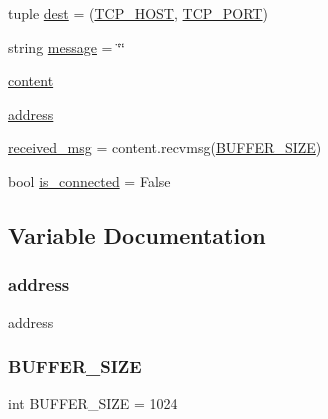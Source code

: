 \begin{DoxyCompactItemize}
\item 
tuple \hyperlink{namespacemain_aec91ef18d6ae5d211e3e74fb715699ea}{dest} = (\hyperlink{namespacemain_a569a69b9efcb7fa479feab68de055c12}{T\+C\+P\+\_\+\+H\+O\+ST}, \hyperlink{namespacemain_abc7b299bafa1e6391d54814cd3f3ae0a}{T\+C\+P\+\_\+\+P\+O\+RT})
\item 
string \hyperlink{namespacemain_ab8140947611504abcb64a4c277effcf5}{message} = \char`\"{}\char`\"{}
\item 
\hyperlink{namespacemain_a6858851eee0e05f318897984757b59dc}{content}
\item 
\hyperlink{namespacemain_ade5a18d52133ef21f211020ceb464c07}{address}
\item 
\hyperlink{namespacemain_a8d14fa3a443cc15581d7c7b0fe102193}{received\+\_\+msg} = content.\+recvmsg(\hyperlink{namespacemain_acd8d62179f75714af34ae50caa397a73}{B\+U\+F\+F\+E\+R\+\_\+\+S\+I\+ZE})
\item 
bool \hyperlink{namespacemain_a5995db87b2ef40e52a47d2fb1f13ae42}{is\+\_\+connected} = False
\end{DoxyCompactItemize}


\subsection{Variable Documentation}
\mbox{\label{namespacemain_ade5a18d52133ef21f211020ceb464c07}} 
\subsubsection{\texorpdfstring{address}{address}}
{\footnotesize\ttfamily address}

\mbox{\label{namespacemain_acd8d62179f75714af34ae50caa397a73}} 
\subsubsection{\texorpdfstring{B\+U\+F\+F\+E\+R\+\_\+\+S\+I\+ZE}{BUFFER\_SIZE}}
{\footnotesize\ttfamily int B\+U\+F\+F\+E\+R\+\_\+\+S\+I\+ZE = 1024}

\mbox{\label{namespacemain_a41c8678c8804b3188a761b00a649d445}} 
